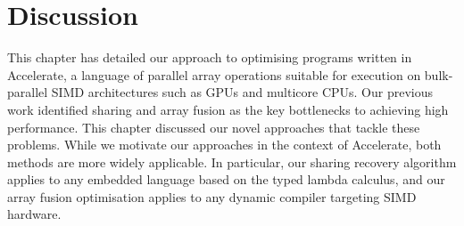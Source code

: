 %
%
%
%


\section{Discussion}

This chapter has detailed our approach to optimising programs written in
Accelerate, a language of parallel array operations suitable for execution on
bulk-parallel SIMD architectures such as GPUs and multicore CPUs. Our previous
work identified sharing and array fusion as the key bottlenecks to achieving
high performance. This chapter discussed our novel approaches that tackle these
problems. While we motivate our approaches in the context of Accelerate, both
methods are more widely applicable. In particular, our sharing recovery
algorithm applies to any embedded language based on the typed lambda calculus,
and our array fusion optimisation applies to any dynamic compiler targeting
SIMD hardware.

